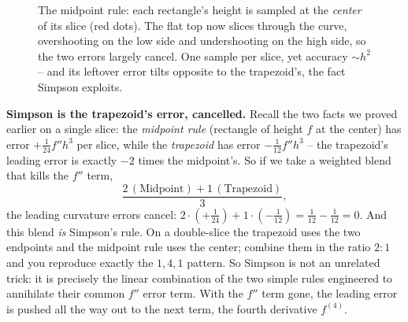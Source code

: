 \begin{figure}[H]
\centering
{}
\caption{The midpoint rule: each rectangle's height is sampled at the \emph{center} of its slice (red dots). The flat top now slices through the curve, overshooting on the low side and undershooting on the high side, so the two errors largely cancel. One sample per slice, yet accuracy $\sim h^2$ -- and its leftover error tilts opposite to the trapezoid's, the fact Simpson exploits.}
\label{ch27:fig-mid}
\end{figure}

\begin{whybox}
\textbf{Simpson is the trapezoid's error, cancelled.} Recall the two facts we proved earlier on a single slice: the \emph{midpoint rule} (rectangle of height $f$ at the center) has error $+\tfrac{1}{24} f'' h^3$ per slice, while the \emph{trapezoid} has error $-\tfrac{1}{12}f'' h^3$ -- the trapezoid's leading error is exactly $-2$ times the midpoint's. So if we take a weighted blend that kills the $f''$ term,
\[
\frac{2\,(\text{Midpoint}) + 1\,(\text{Trapezoid})}{3},
\]
the leading curvature errors cancel: $2\cdot(+\tfrac{1}{24}) + 1\cdot(-\tfrac{1}{12}) = \tfrac{1}{12} - \tfrac{1}{12} = 0$. And this blend \emph{is} Simpson's rule. On a double-slice the trapezoid uses the two endpoints and the midpoint rule uses the center; combine them in the ratio $2{:}1$ and you reproduce exactly the $1,4,1$ pattern. So Simpson is not an unrelated trick: it is precisely the linear combination of the two simple rules engineered to annihilate their common $f''$ error term. With the $f''$ term gone, the leading error is pushed all the way out to the next term, the fourth derivative $f^{(4)}$.
\end{whybox}

